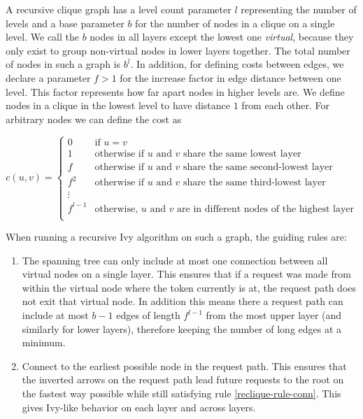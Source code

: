 \documentclass[a4paper, oneside]{discothesis}
\begin{document}
A recursive clique graph has a level count parameter $l$ representing the number of levels and a base parameter $b$ for the number of nodes in a clique on a single level. We call the $b$ nodes in all layers except the lowest one \textit{virtual}, because they only exist to group non-virtual nodes in lower layers together. The total number of nodes in such a graph is $b^l$. In addition, for defining costs between edges, we declare a parameter $f>1$ for the increase factor in edge distance between one level. This factor represents how far apart nodes in higher levels are. We define nodes in a clique in the lowest level to have distance $1$ from each other. For arbitrary nodes we can define the cost as

\begin{equation}
c(u,v)=\begin{cases}
0 & \text{if $u=v$} \\
1 & \text{otherwise if $u$ and $v$ share the same lowest layer} \\
f & \text{otherwise if $u$ and $v$ share the same second-lowest layer} \\
f^2 & \text{otherwise if $u$ and $v$ share the same third-lowest layer} \\
\vdots & \\
f^{l-1} & \text{otherwise, $u$ and $v$ are in different nodes of the highest layer} \\
\end{cases}
\end{equation}

When running a recursive Ivy algorithm on such a graph, the guiding rules are:
\begin{enumerate}
\item The spanning tree can only include at most one connection between all virtual nodes on a single layer. This ensures that if a request was made from within the virtual node where the token currently is at, the request path does not exit that virtual node. In addition this means there a request path can include at most $b-1$ edges of length $f^{l-1}$ from the most upper layer (and similarly for lower layers), therefore keeping the number of long edges at a minimum.
\label{reclique-rule-conn}
\item Connect to the earliest possible node in the request path. This ensures that the inverted arrows on the request path lead future requests to the root on the fastest way possible while still satisfying rule \ref{reclique-rule-conn}. This gives Ivy-like behavior on each layer and across layers.
\label{reclique-rule-early}
\end{enumerate}
\end{document}
